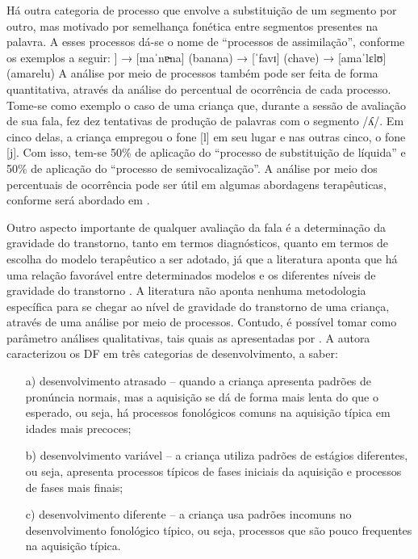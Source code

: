 \documentclass[output=paper,colorlinks,citecolor=brown,booklanguage=portuguese]{langscibook}
\begin{document}
Há outra categoria de processo que envolve a substituição de um segmento por outro, mas motivado por semelhança fonética entre segmentos presentes na palavra. A esses processos dá-se o nome de “processos de assimilação”, conforme os exemplos a seguir:
\ea {[baˈnɐ̴na}]  → [maˈnɐ̴na] (banana)
\z
\ea {[ˈʃavɪ]} → [ˈfavɪ] (chave)
\z
\ea {[amaˈɾεlʊ]} → [amaˈlεlʊ] (amarelu)
\z
A análise por meio de processos também pode ser feita de forma quantitativa, através da análise do percentual de ocorrência de cada processo. Tome-se como exemplo o caso de uma criança que, durante a sessão de avaliação de sua fala, fez dez tentativas de produção de palavras com o segmento /ʎ/. Em cinco delas, a criança empregou o fone [l] em seu lugar e nas outras cinco, o fone [j]. Com isso, tem-se 50\% de aplicação do “processo de substituição de líquida” e 50\% de aplicação do “processo de semivocalização”. A análise por meio dos percentuais de ocorrência pode ser útil em algumas abordagens terapêuticas, conforme será abordado em .

Outro aspecto importante de qualquer avaliação da fala é a determinação da gravidade do transtorno, tanto em termos diagnósticos, quanto em termos de escolha do modelo terapêutico a ser adotado, já que a literatura aponta que há uma relação favorável entre determinados modelos e os diferentes níveis de gravidade do transtorno \citep{Bagetti2005, Pagliarin2009}. A literatura não aponta nenhuma metodologia específica para se chegar ao nível de gravidade do transtorno de uma criança, através de uma análise por meio de processos. Contudo, é possível tomar como parâmetro análises qualitativas, tais quais as apresentadas por \citet{Grunwell1997}. A autora caracterizou os DF em três categorias de desenvolvimento, a saber:



\begin{itemize}
    \item [a)] desenvolvimento atrasado -- quando a criança apresenta padrões de pronúncia normais, mas a aquisição se dá de forma mais lenta do que o esperado, ou seja, há processos fonológicos comuns na aquisição típica em idades mais precoces;
    \item[b)] desenvolvimento variável -- a criança utiliza padrões de estágios diferentes, ou seja, apresenta processos típicos de fases iniciais da aquisição e processos de fases mais finais; 
    \item[c)] desenvolvimento diferente --  a criança usa padrões incomuns  no desenvolvimento  fonológico típico, ou seja, processos que são pouco frequentes na aquisição típica.
\end{itemize}
\end{document}
